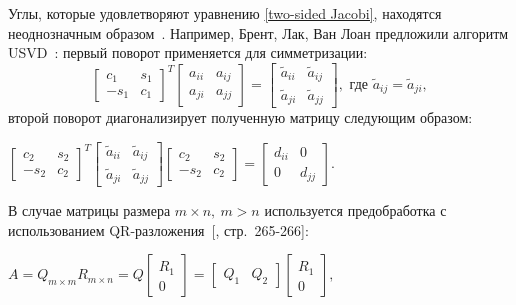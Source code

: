 Углы, которые удовлетворяют уравнению \eqref{two-sided Jacobi}, находятся неоднозначным образом~\cite{Dongarra2018}. Например, Брент, Лак, Ван Лоан предложили алгоритм USVD~\cite{10.5555/867597}: первый поворот применяется для симметризации:
\begin{equation}
\begin{bmatrix}
    c_1&s_1\\
    -s_1&c_1
\end{bmatrix}^T
\begin{bmatrix}
    a_{ii}&a_{ij}\\
    a_{ji}&a_{jj}
\end{bmatrix} = 
\begin{bmatrix}
    \tilde{a}_{ii}&\tilde{a}_{ij}\\
    \tilde{a}_{ji}&\tilde{a}_{jj}
\end{bmatrix}, \text{ где } \tilde{a}_{ij} = \tilde{a}_{ji},
\end{equation}
второй поворот диагонализирует полученную матрицу следующим образом: \begin{center}
$\begin{bmatrix}
    c_2&s_2\\
    -s_2&c_2
\end{bmatrix}^T
\begin{bmatrix}
     \tilde{a}_{ii}&\tilde{a}_{ij}\\
    \tilde{a}_{ji}&\tilde{a}_{jj}
\end{bmatrix}
\begin{bmatrix}
    c_2&s_2\\
    -s_2&c_2
\end{bmatrix} = 
\begin{bmatrix}
    d_{ii}&0\\
    0&d_{jj}
\end{bmatrix}.$
\end{center}
В случае матрицы размера $m \times n, \ m>n$ используется предобработка с использованием QR-разложения~[, стр.~265-266]: 
\begin{center}
    $A = Q_{m\times m}R_{m\times n} = Q\begin{bmatrix}
        R_1\\0
    \end{bmatrix} = \begin{bmatrix}
        Q_1&Q_2
    \end{bmatrix}
    \begin{bmatrix}
        R_1\\0
    \end{bmatrix},
    $
\end{center}
